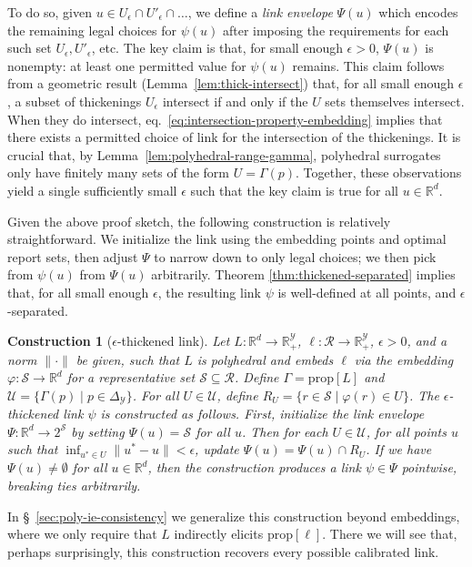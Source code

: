 \documentclass[twoside,11pt]{article}
\newcommand{\reals}{\mathbb{R}}
\newcommand{\prop}[1]{\mathrm{prop}[#1]}
\newcommand{\simplex}{\Delta_\Y}
\newcommand{\R}{\mathcal{R}}
\newcommand{\Sc}{\mathcal{S}}
\newcommand{\U}{\mathcal{U}}
\newcommand{\Y}{\mathcal{Y}}
\newtheorem{construction}{Construction}
\begin{document}
To do so, given $u \in U_\epsilon \cap U'_\epsilon \cap \dots$, we define a \emph{link envelope} $\Psi(u)$ which encodes the remaining legal choices for $\psi(u)$ after imposing the requirements for each such set $U_\epsilon,U'_\epsilon$, etc.
The key claim is that, for small enough $\epsilon > 0$, $\Psi(u)$ is nonempty: at least one permitted value for $\psi(u)$ remains.
This claim follows from a geometric result (Lemma~\ref{lem:thick-intersect}) that, for all small enough $\epsilon$, a subset of thickenings $U_{\epsilon}$ intersect if and only if the $U$ sets themselves intersect.
When they do intersect, eq.~\eqref{eq:intersection-property-embedding} implies that there exists a permitted choice of link for the intersection of the thickenings.
It is crucial that, by Lemma~\ref{lem:polyhedral-range-gamma}, polyhedral surrogates only have finitely many sets of the form $U = \Gamma(p)$.
Together, these observations yield a single sufficiently small $\epsilon$ such that the key claim is true for all $u \in \reals^d$.

Given the above proof sketch, the following construction is relatively straightforward.
We initialize the link using the embedding points and optimal report sets, then adjust $\Psi$ to narrow down to only legal choices; we then pick from $\psi(u)$ from $\Psi(u)$ arbitrarily.
Theorem \ref{thm:thickened-separated} implies that, for all small enough $\epsilon$, the resulting link $\psi$ is well-defined at all points, and $\epsilon$-separated.
\begin{construction}[$\epsilon$-thickened link] \label{const:eps-thick-link}
  Let $L:\reals^d\to\reals^\Y_+$, $\ell:\R\to\reals^\Y_+$, $\epsilon > 0$, and a norm $\|\cdot\|$ be given, such that $L$ is polyhedral and embeds $\ell$ via the embedding $\varphi: \Sc \to \reals^d$ for a representative set $\Sc\subseteq\R$.
  Define $\Gamma = \prop L$ and $\U = \{\Gamma(p) \mid p \in \simplex\}$.
  For all $U \in \U$, define $R_U = \{r \in \Sc \mid \varphi(r) \in U\}$.
  The \emph{$\epsilon$-thickened link} $\psi$ is constructed as follows.
  First, initialize the \emph{link envelope} $\Psi: \reals^d \to 2^{\Sc}$ by setting $\Psi(u) = \Sc$ for all $u$.
  Then for each $U \in \U$, for all points $u$ such that $\inf_{u^* \in U} \|u^*-u\| < \epsilon$, update $\Psi(u) = \Psi(u) \cap R_U$.
  If we have $\Psi(u)\neq\emptyset$ for all $u\in\reals^d$, then the construction \emph{produces a link} $\psi \in \Psi$ pointwise, breaking ties arbitrarily.
\end{construction}
In \S~\ref{sec:poly-ie-consistency} we generalize this construction beyond embeddings, where we only require that $L$ indirectly elicits $\prop\ell$.
There we will see that, perhaps surprisingly, this construction recovers every possible calibrated link.
\end{document}
